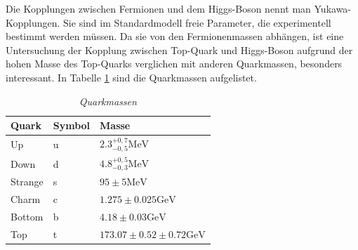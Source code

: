 Die Kopplungen zwischen Fermionen und dem Higgs-Boson nennt man Yukawa-Kopplungen.
Sie sind im Standardmodell freie Parameter, die experimentell bestimmt werden m\"ussen. Da sie von den Fermionenmassen abh\"angen, ist eine Untersuchung der Kopplung zwischen Top-Quark und Higgs-Boson aufgrund der hohen Masse des Top-Quarks verglichen mit anderen Quarkmassen, besonders interessant. In Tabelle \ref{tab:quarkmasse} sind die Quarkmassen aufgelistet.\\

\begin{table}[hhh]\parbox{12cm}{
  \caption[Quarkmassen]{\it Quarkmassen {\rm \cite{Agashe:2014kda}}
  }\label{tab:quarkmasse}}
  \begin{center}
  \begin{tabular}{lll}
  \hline
  {\bf Quark} & {\bf Symbol} & {\bf Masse}  \\
  \hline \hline
     Up		& u & $\num{2,3}^{{+0,7}}_{{-0,5}}\si{\mega\electronvolt}$ \\
     Down	& d & $\num{4,8}^{{+0,5}}_{{-0,3}}\si{\mega\electronvolt}$ \\
     Strange& s & $\num{95}\pm \num{5}\si{\mega\electronvolt}$ \\
     Charm	& c & $\num{1,275}\pm \num{0,025}\si{\giga\electronvolt}$ \\ 
  	 Bottom & b & $\num{4,18}\pm \num{0,03}\si{\giga\electronvolt}$ \\
     Top    & t & $\num{173,07}\pm \num{0,52}\pm \num{0,72}\si{\giga\electronvolt}$\\                                
  \hline
  \end{tabular}
  \end{center}
\end{table}

